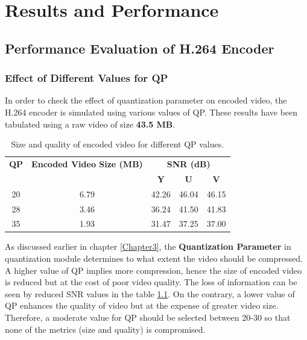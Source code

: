 
\chapter{Results and Performance} %
\label{Chapter5}


\section{Performance Evaluation of H.264 Encoder}

\subsection{Effect of Different Values for QP}
In order to check the effect of quantization parameter on encoded video, the H.264 encoder is simulated using various values of QP. These results have been tabulated using a raw video of size \textbf{43.5 MB}.
\begin{table}[H]
	\centering
	\begin{tabular}{|c|c|c|c|c|} \hline
		\textbf{QP}  & \textbf{Encoded Video Size (MB)} & \multicolumn{3}{|c|}{\textbf{SNR (dB)}}  \\
		\cline{3-5}
		    &                    &  \textbf{Y} & \textbf{U} & \textbf{V}\\ \hline
		20  &    6.79            & 42.26   & 46.04  & 46.15  \\ \hline
		28  &    3.46            & 36.24   & 41.50  & 41.83  \\ \hline
		35  &    1.93            & 31.47   & 37.25  & 37.00  \\ \hline
	\end{tabular}
	\caption{Size and quality of encoded video for different QP values.}
	\label{tab:qp}
\end{table}
As discussed earlier in chapter \ref{Chapter3}, the \textbf{Quantization Parameter} in quantization module determines to what extent the video should be compressed. A higher value of QP implies more compression, hence the size of encoded video is reduced but at the cost of poor video quality. The loss of information can be seen by reduced SNR values in the table \ref{tab:qp}. On the contrary, a lower value of QP enhances the quality of video but at the expense of greater video size. Therefore, a moderate value for QP should be selected between 20-30 so that none of the metrics (size and quality) is compromised. 


